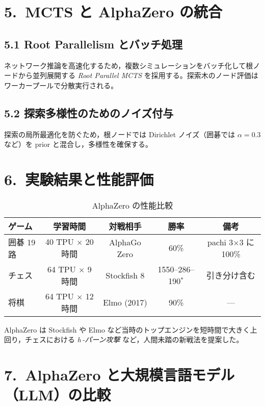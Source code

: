 \documentclass[a4paper,12pt]{article}
\begin{document}
\begin{CJK}{UTF8}{min}
\section*{5.~MCTS と AlphaZero の統合}
\subsection*{5.1 Root Parallelism とバッチ処理}
ネットワーク推論を高速化するため，複数シミュレーションをバッチ化して根ノードから並列展開する \textit{Root Parallel MCTS} を採用する。探索木のノード評価はワーカープールで分散実行される。

\subsection*{5.2 探索多様性のためのノイズ付与}
探索の局所最適化を防ぐため，根ノードでは Dirichlet ノイズ（囲碁では $\alpha=0.3$ など）を prior と混合し，多様性を確保する。

\section*{6.~実験結果と性能評価}
\begin{table}[htbp]
  \centering
  \caption{AlphaZero の性能比較}
  \begin{tabular}{lcccc}
    \toprule
    ゲーム & 学習時間 & 対戦相手 & 勝率 & 備考\\
    \midrule
    囲碁 19 路 & 40 TPU $\times$ 20 時間 & AlphaGo Zero & 60\% & pachi 3$\times$3 に 100\%\\
    チェス      & 64 TPU $\times$ 9 時間  & Stockfish 8  & 1550--286--190$^{*}$ & 引き分け含む\\
    将棋        & 64 TPU $\times$ 12 時間 & Elmo (2017) & 90\% & ---\\
    \bottomrule
  \end{tabular}
  \label{tab:results}
\end{table}

AlphaZero は Stockfish や Elmo など当時のトップエンジンを短時間で大きく上回り，チェスにおける \textit{h\,-パーン攻撃} など，人間未踏の新戦法を提案した。

\section*{7.~AlphaZero と大規模言語モデル（LLM）の比較}

\end{CJK}
\end{document}

